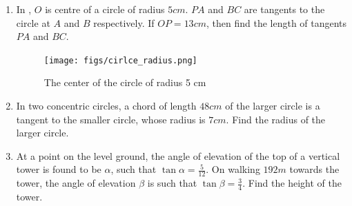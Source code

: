 \begin{enumerate}[label=\arabic*.,ref=\theenumi]
    \item In , $O$ is centre of a circle of radius $5 cm$. $PA$ and $BC$ are tangents to the circle at $A$ and $B$ respectively. If $OP = 13 cm$, then find the length of tangents $PA$ and $BC$.
     \begin{figure}[H]
        \centering
        \texttt{[image: figs/cirlce\_radius.png]}
        \caption{The center of the circle of radius 5 cm}
	     \label{fig:fig4.png}
    \end{figure}
    
    \item In two concentric circles, a chord of length $48 cm$ of the larger
circle is a tangent to the smaller circle, whose radius is $7 cm$. Find the radius of the larger circle. 
    \item At a point on the level ground, the angle of elevation of the top
of a vertical tower is found to be $\alpha$, such that $\tan \alpha =\frac{5}{12} $. On walking $192 m$ towards the tower, the angle of elevation $\beta$ is such that $\tan \beta=\frac{3}{4}$. Find the height of the tower. 
    \end{enumerate}

